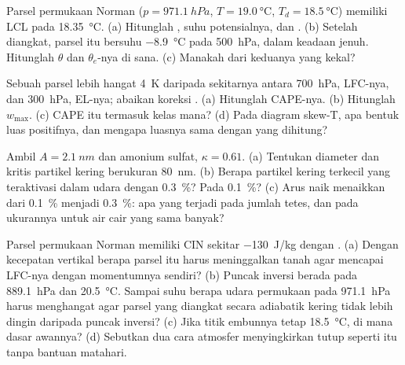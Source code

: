 \begin{exercise}[$\star\star$]\label{exo:b2:atmospheric-thermodynamics:7}
Parsel permukaan Norman ($p = \qty{971.1}{hPa}$, $T = \qty{19.0}{\celsius}$, $T_d =
\qty{18.5}{\celsius}$) memiliki LCL pada \qty{18.35}{\celsius}. (a) Hitunglah ,
suhu potensialnya, dan . (b) Setelah diangkat, parsel itu bersuhu
\qty{-8.9}{\celsius} pada \qty{500}{hPa}, dalam keadaan jenuh. Hitunglah $\theta$ dan $\theta_e$-nya di sana.
(c) Manakah dari keduanya yang kekal?
\end{exercise}

\begin{exercise}[$\star\star$]\label{exo:b2:atmospheric-thermodynamics:8}
Sebuah parsel lebih hangat \qty{4}{K} daripada sekitarnya antara \qty{700}{hPa}, LFC-nya, dan
\qty{300}{hPa}, EL-nya; abaikan koreksi . (a) Hitunglah CAPE-nya. (b)
Hitunglah $w_{\max}$. (c) CAPE itu termasuk kelas mana? (d) Pada diagram skew-T, apa
bentuk luas positifnya, dan mengapa luasnya sama dengan yang dihitung?
\end{exercise}

\begin{exercise}[$\star\star$]\label{exo:b2:atmospheric-thermodynamics:9}
Ambil $A = \qty{2.1}{nm}$ dan amonium sulfat, $\kappa = 0.61$. (a) Tentukan diameter dan
 kritis partikel kering berukuran \qty{80}{nm}. (b) Berapa partikel kering terkecil yang
teraktivasi dalam udara dengan  \qty{0.3}{\percent}? Pada \qty{0.1}{\percent}? (c) Arus naik
menaikkan  dari \qty{0.1}{\percent} menjadi \qty{0.3}{\percent}: apa yang terjadi pada
jumlah tetes, dan pada ukurannya untuk air cair yang sama banyak?
\end{exercise}

\begin{exercise}[$\star\star\star$]\label{exo:b2:atmospheric-thermodynamics:10}
Parsel permukaan Norman memiliki CIN sekitar \qty{-130}{J/kg} dengan .
(a) Dengan kecepatan vertikal berapa parsel itu harus meninggalkan tanah agar mencapai LFC-nya dengan
momentumnya sendiri? (b) Puncak inversi berada pada \qty{889.1}{hPa} dan \qty{20.5}{\celsius}. Sampai suhu
berapa udara permukaan pada \qty{971.1}{hPa} harus menghangat agar parsel yang diangkat secara adiabatik
kering tidak lebih dingin daripada puncak inversi? (c) Jika titik embunnya tetap
\qty{18.5}{\celsius}, di mana dasar awannya? (d) Sebutkan dua cara atmosfer
menyingkirkan tutup seperti itu tanpa bantuan matahari.
\end{exercise}

